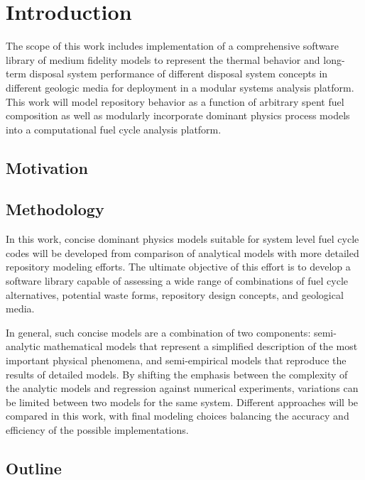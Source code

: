 \chapter{Introduction}
The scope of this work includes implementation of a comprehensive software library of
medium fidelity models to represent the thermal behavior and long-term disposal system
performance of different disposal system concepts in different geologic media for deployment in a 
modular systems analysis platform. This work will model repository behavior as a function of 
arbitrary spent fuel composition as well as modularly incorporate dominant physics process models 
into a computational fuel cycle analysis platform.

\section{Motivation}



\section{Methodology}
In this work, concise dominant physics 
models suitable for system level fuel cycle codes will be developed from comparison of analytical models 
with more detailed repository modeling efforts. The ultimate objective of this effort is to
develop a software library capable of assessing a wide range of combinations of fuel cycle
alternatives, potential waste forms, repository design concepts, and geological media. 

In general, such concise models are a combination of two components: semi-analytic
mathematical models that represent a simplified description of the most important physical 
phenomena, and semi-empirical models that reproduce the results of detailed models.
By shifting the emphasis between the complexity of the analytic models and regression against 
numerical experiments, variations can be limited
between two models for the same system.  Different approaches will be compared in this
work, with final modeling choices balancing the accuracy and efficiency of the possible
implementations.

\section{Outline}


